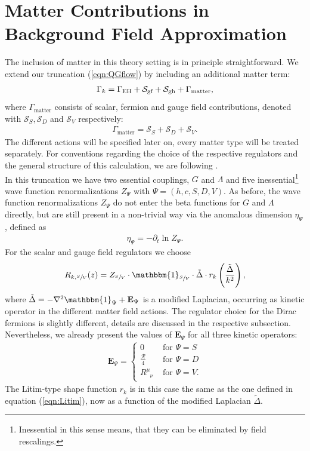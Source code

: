 \section{Matter Contributions in Background Field Approximation}
The inclusion of matter in this theory setting is in principle straightforward. We extend our truncation (\ref{eqn:QGflow}) by including an additional matter term: 
\begin{align}
	\Gamma_{k} = \Gamma_{\text{EH}} + \mathcal{S}_{\text{gf}}+ \mathcal{S}_{\text{gh}}+ \Gamma_{\text{matter}},
\end{align}
where $\Gamma_{\mathrm{matter}}$ consists of scalar, fermion and gauge field contributions, denoted with $\mathcal{S}_S, \mathcal{S}_D$ and $\mathcal{S}_V$ respectively:
\begin{align}
	\Gamma_{\text{matter}} = \mathcal{S}_S + \mathcal{S}_D + \mathcal{S}_V.
\end{align}
The different actions will be specified later on, every matter type will be treated separately. For conventions regarding the choice of the respective regulators and the general structure of this calculation, we are following \cite{DonaEichhornPercacci2013}. \\
In this truncation we have two essential couplings, $G$ and $\Lambda$ and five inessential\footnote{Inessential in this sense means, that they can be eliminated by field rescalings.} wave function renormalizations $Z_{\Psi}$ with $\Psi = (h,c,S,D,V)$. As before, the wave function renormalizations $Z_{\Psi}$ do not enter the beta functions for $G$ and $\Lambda$ directly, but are still present in a non-trivial way via the anomalous dimension $\eta_{\Psi}$, defined as
\begin{align}
	\eta_{\Psi} = -\partial_t \ln Z_{\Psi}.
\end{align}
For the scalar and gauge field regulators we choose
\begin{align}
	R_{k,\sfrac{S}{V}}(z) = Z_{\sfrac{S}{V}} \cdot \mathbbm{1}_{\sfrac{S}{V}} \cdot \tilde{\Delta}\cdot r_k\left(\frac{\tilde{\Delta}}{k^2}\right),
	\label{eqn:Rk_matter}
\end{align}
where $\tilde{\Delta}= -\nabla^2\mathbbm{1}_{\Psi} + \mathbf{E}_{\Psi}$ is a modified Laplacian, occurring as kinetic operator in the different matter field actions. The regulator choice for the Dirac fermions is slightly different, details are discussed in the respective subsection. Nevertheless, we already present the values of $\mathbf{E}_{\Psi}$ for all three kinetic operators:
\begin{align}
	\mathbf{E}_{\Psi} =  \left\{\begin{array}{ll}{0} & {\text { for } \Psi = S} \\[5pt] {\frac{\mathcal{R}}{4}} & {\text { for } \Psi = D}\\[5pt]  {R^{\mu}_{\phantom{\mu}\nu}} & {\text { for } \Psi = V.}\end{array}\right.
\end{align}
The Litim-type shape function $r_k$ is in this case the same as the one defined in equation (\ref{eqn:Litim}), now as a function of the modified Laplacian $\tilde{\Delta}$.

